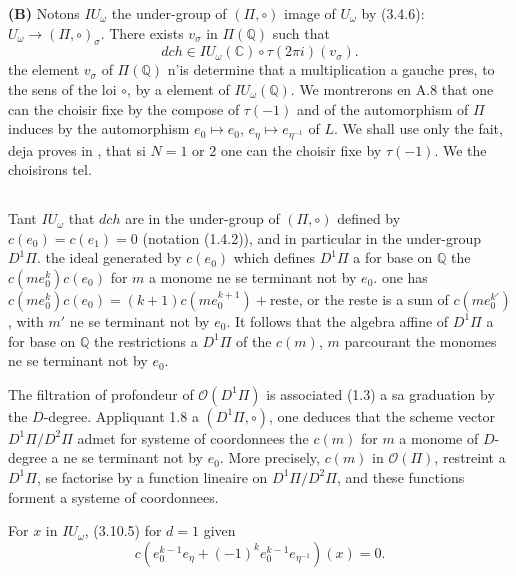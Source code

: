 \documentclass[11pt,a4paper]{article}
\theoremstyle{plain}
\theoremstyle{definition}
\newcommand{\dch}{\mathit{dch}}
\newcommand{\Q}{\mathbb{Q}}
\newcommand{\C}{\mathbb{C}}
\begin{document}
\textbf{(B)} Notons $IU_\omega$ the under-group of $(\Pi, \circ)$ image of $U_\omega$ by (3.4.6): $U_\omega \to (\Pi, \circ)_\sigma$. There exists $v_\sigma$ in $\Pi(\Q)$ such that
\begin{equation}\label{eq:5.1.1}
\dch \in IU_\omega(\C) \circ \tau(2\pi i)(v_\sigma).
\end{equation}
the element $v_\sigma$ of $\Pi(\Q)$ n'is determine that a multiplication a gauche pres, to the sens of the loi $\circ$, by a element of $IU_\omega(\Q)$. We montrerons en A.8 that one can the choisir fixe by the compose of $\tau(-1)$ and of the automorphism of $\Pi$ induces by the automorphism $e_0 \mapsto e_0$, $e_\eta \mapsto e_{\eta^{-1}}$ of $L$. We shall use only the fait, deja proves in \cite{1}, that si $N=1$ or $2$ one can the choisir fixe by $\tau(-1)$. We the choisirons tel.

\subsection{}
Tant $IU_\omega$ that $\dch$ are in the under-group of $(\Pi, \circ)$ defined by $c(e_0) = c(e_1) = 0$ (notation (1.4.2)), and in particular in the under-group $D^1\Pi$. the ideal generated by $c(e_0)$ which defines $D^1\Pi$ a for base on $\Q$ the $c(me_0^k)c(e_0)$ for $m$ a monome ne se terminant not by $e_0$. one has $c(me_0^k)c(e_0) = (k+1)c(me_0^{k+1}) + \text{reste}$, or the reste is a sum of $c(me_0^{k'})$, with $m'$ ne se terminant not by $e_0$. It follows that the algebra affine of $D^1\Pi$ a for base on $\Q$ the restrictions a $D^1\Pi$ of the $c(m)$, $m$ parcourant the monomes ne se terminant not by $e_0$.

The filtration of profondeur of $\mathcal{O}(D^1\Pi)$ is associated (1.3) a sa graduation by the $D$-degree. Appliquant 1.8 a $(D^1\Pi, \circ)$, one deduces that the scheme vector $D^1\Pi/D^2\Pi$ admet for systeme of coordonnees the $c(m)$ for $m$ a monome of $D$-degree a ne se terminant not by $e_0$. More precisely, $c(m)$ in $\mathcal{O}(\Pi)$, restreint a $D^1\Pi$, se factorise by a function lineaire on $D^1\Pi/D^2\Pi$, and these functions forment a systeme of coordonnees.

For $x$ in $IU_\omega$, (3.10.5) for $d=1$ given
\begin{equation}\label{eq:5.2.1}
c(e_0^{k-1}e_\eta + (-1)^k e_0^{k-1}e_{\eta^{-1}})(x) = 0.
\end{equation}
\end{document}
